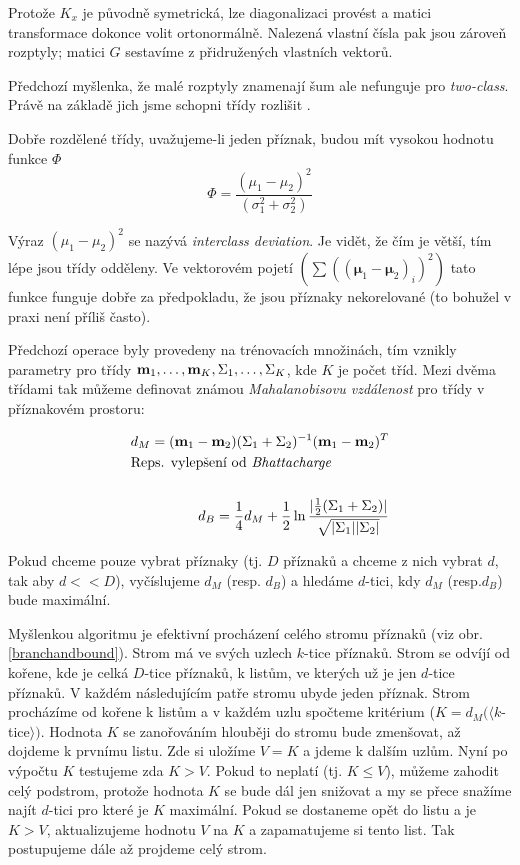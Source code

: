 Protože $K_x$ je původně symetrická, lze diagonalizaci provést a matici transformace dokonce volit ortonormálně.
Nalezená vlastní čísla pak jsou zároveň rozptyly; matici $G$ sestavíme z přidružených vlastních vektorů.

Předchozí myšlenka, že malé rozptyly znamenají šum ale nefunguje pro {\em two-class}. Právě na základě jich
jsme schopni třídy rozlišit .


Dobře rozdělené třídy, uvažujeme-li jeden příznak, budou mít vysokou hodnotu funkce $\Phi$
\begin{equation}
\Phi=\frac{(\mu_1-\mu_2)^2}{(\sigma_1^2+\sigma_2^2)}
\end{equation}

\def\bmu{\mathbf{\mu}}
Výraz $(\mu_1-\mu_2)^2$ se nazývá {\em interclass deviation}. Je vidět, že čím je větší, tím lépe jsou třídy odděleny.
Ve vektorovém pojetí $(\sum((\bmu_1-\bmu_2)_i)^2)$ tato funkce funguje dobře  za předpokladu, že jsou příznaky nekorelované (to bohužel v praxi 
není příliš často). 

Předchozí operace byly provedeny na trénovacích množinách, tím vznikly parametry pro třídy $\mathbf{m}_1, \dots, \mathbf{m}_K,
\Sigma_1,\dots,\Sigma_K$, kde $K$ je počet tříd. Mezi dvěma třídami tak můžeme definovat známou {\em Mahalanobisovu 
vzdálenost} pro třídy v příznakovém prostoru:

\begin{eqnarray}
d_M=(\m_1-\m_2)(\Sigma_1+\Sigma_2)^{-1}(\m_1-\m_2)^T\\
\noalign{\hbox{Reps. vylepšení od {\em Bhattacharge}}}\\
d_B=\frac{1}{4}d_M+\frac{1}{2}\ln\frac{|\frac{1}{2}(\Sigma_1+\Sigma_2)|}{\sqrt{|\Sigma_1||\Sigma_2|}}
\end{eqnarray}
 
Pokud chceme pouze vybrat příznaky (tj. $D$ příznaků a chceme z nich vybrat $d$, tak aby $d<<D$), vyčíslujeme
$d_M$ (resp. $d_B$) a hledáme $d$-tici, kdy $d_M$ (resp.$d_B$) bude maximální.

Myšlenkou algoritmu je efektivní procházení celého stromu příznaků (viz obr. \ref{branchandbound}). Strom má ve 
svých uzlech $k$-tice příznaků. Strom se odvíjí od kořene, kde je celká $D$-tice příznaků, k listům, ve kterých už je jen
 $d$-tice příznaků. V každém následujícím patře stromu ubyde jeden příznak. Strom procházíme od kořene k listům
 a v každém uzlu spočteme kritérium ($K=d_M(\langle k$-tice$\rangle)$. Hodnota $K$ se zanořováním hlouběji do stromu bude zmenšovat, až
 dojdeme k prvnímu listu. Zde si uložíme $V=K$ a jdeme k dalším uzlům. Nyní po výpočtu $K$ testujeme zda $K>V$. Pokud
 to neplatí (tj. $K\leq V$), můžeme zahodit celý podstrom, protože hodnota $K$ se bude dál jen snižovat a my se 
 přece snažíme najít $d$-tici pro které je $K$ maximální. Pokud se dostaneme opět do listu a je $K>V$, 
 aktualizujeme hodnotu $V$ na $K$ a zapamatujeme si tento list. Tak postupujeme dále až projdeme celý strom.
 
